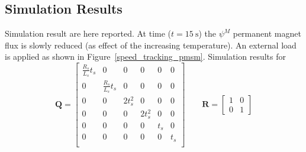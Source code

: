 \documentclass[11pt,a4paper,oneside]{book}
\numberwithin{equation}{section}
\theoremstyle{it}
\theoremstyle{definition}
\begin{document}
\subsection{Simulation Results}
Simulation result are here reported. At time ($t=\SI{15}{\second}$) the 
$\psi^M$ permanent magnet flux is slowly reduced (as effect of the increasing 
temperature). An external load is applied as shown in 
Figure~\ref{speed_tracking_pmsm}.
Simulation results for 
\begin{equation}
	\mathbf{Q}=\begin{bmatrix}
		\frac{R_s}{L_s}t_s & 0 & 0 & 0 & 0 & 0 \\ 0 & \frac{R_s}{L_s}t_s & 0 & 
		0 & 0 & 0 \\
		0 & 0 & 2t_s^2 & 0 & 0 & 0 \\ 0 & 0 & 0 & 2t_s^2 & 0 & 0 \\
		0 & 0 & 0 & 0 & t_s & 0 \\ 0 & 0 & 0 & 0 & 0 & t_s \\
	\end{bmatrix} \qquad \mathbf{R}=\begin{bmatrix}
		1 & 0 \\ 0 & 1
	\end{bmatrix}
\end{equation}
\end{document}
